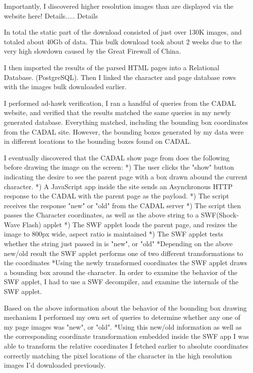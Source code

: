             Importantly, I discovered higher resolution images than are displayed via the website here!  Details..... Details
            
            In total the static part of the download consisted of just over 130K images, and totaled about 40Gb of data.  This bulk download took about 2 weeks due to the very high slowdown caused by the Great Firewall of China.
            
            I then imported the results of the parsed HTML pages into a Relational Database. (PostgreSQL).  Then I linked the character and page database rows with the images bulk downloaded earlier.
            
            I performed ad-hawk verification, I ran a handful of queries from the CADAL website, and verified that the results matched the same queries in my newly generated database.   Everything matched, including the bounding box coordinates from the CADAL site.  However, the bounding boxes generated by my data were in different locations to the bounding boxes found on CADAL.
            
            
            I eventually discovered that the CADAL show page from does the following before drawing the image on the screen:
                *) The user clicks the "show" button indicating the desire to see the parent page with a box drawn abound the current character.
                *) A JavaScript app inside the site sends an Asynchronous HTTP response to the CADAL with the parent page as the payload.
                *) The script receives the response "new" or "old" from the CADAL server
                *) The script then passes the Character coordinates, as well as the above string to a SWF(Shock-Wave Flash) applet
                *) The SWF applet loads the parent page, and resizes the image to 800px wide, aspect ratio is maintained
                *) The SWF applet tests whether the string just passed in is "new", or "old"
                    *Depending on the above new/old result the SWF applet performs one of two different transformations to the coordinates
                    *Using the newly transformed coordinates the SWF applet draws a bounding box around the character.
                In order to examine the behavior of the SWF applet, I had to use a SWF decompiler, and examine the internals of the SWF applet.
            
                Based on the above information about the behavior of the bounding box drawing mechanism I performed my own set of queries to determine whether any one of my page images was "new", or "old".
                *Using this new/old information as well as the corresponding coordinate transformation embedded inside the SWF app I was able to transform the relative coordinates I fetched earlier to absolute coordinates correctly matching the pixel locations of the character in the high resolution images I'd downloaded previously.
                

